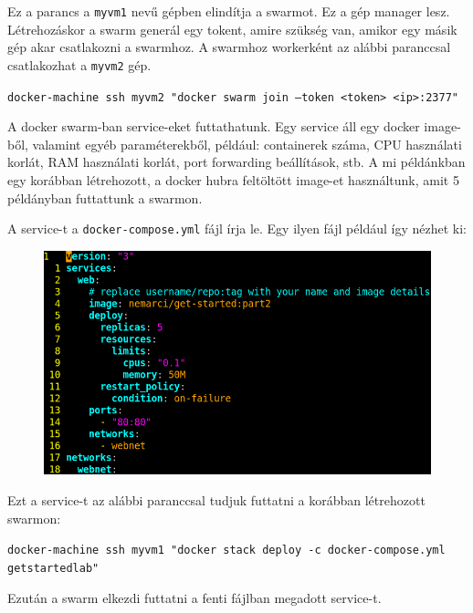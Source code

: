 \documentclass[]{article}
\numberwithin{equation}{section}
\begin{document}
Ez a parancs a \texttt{myvm1} nevű gépben elindítja a swarmot. Ez a gép manager lesz. Létrehozáskor a swarm generál egy tokent, amire szükség van, amikor egy másik gép akar csatlakozni a swarmhoz. A swarmhoz workerként az alábbi paranccsal csatlakozhat a \texttt{myvm2} gép.

\texttt{docker-machine ssh myvm2 "docker swarm join --token <token> <ip>:2377"}

A docker swarm-ban service-eket futtathatunk. Egy service áll egy docker image-ből, valamint egyéb paraméterekből, például: containerek száma, CPU használati korlát, RAM használati korlát, port forwarding beállítások, stb. A mi példánkban egy korábban létrehozott, a docker hubra feltöltött image-et használtunk, amit 5 példányban futtattunk a swarmon.

A service-t a \texttt{docker-compose.yml} fájl írja le. Egy ilyen fájl például így nézhet ki:

\begin{figure}[H]
	\centering
	\includegraphics[width=0.7\linewidth]{service}
	\caption{}
	\label{fig:service}
\end{figure}

Ezt a service-t az alábbi paranccsal tudjuk futtatni a korábban létrehozott swarmon:

\texttt{docker-machine ssh myvm1 "docker stack deploy -c docker-compose.yml getstartedlab"}

Ezután a swarm elkezdi futtatni a fenti fájlban megadott service-t.
\end{document}
